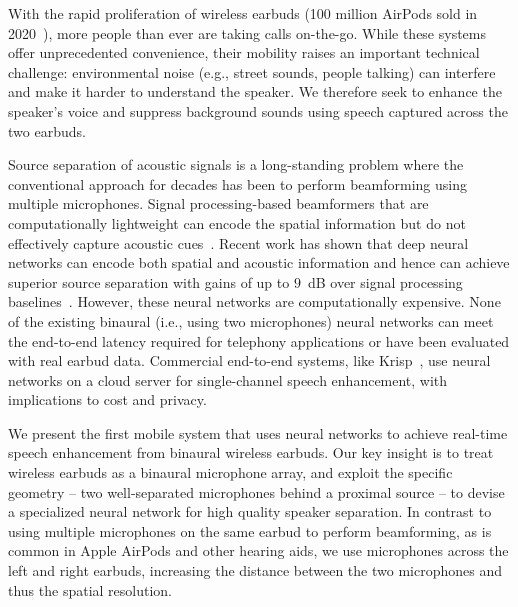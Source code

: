 \documentclass [11pt, proquest] {uwthesis}[2020/02/24]
\begin{document}


With the rapid proliferation of wireless earbuds (100 million AirPods sold in 2020~\cite{airpodssales}), more people than ever are taking calls on-the-go.  While these systems offer unprecedented convenience, their mobility raises an important technical challenge:  environmental noise (e.g., street sounds, people talking)  can interfere and make it harder to understand the speaker.
We therefore seek to enhance the speaker's voice and suppress background sounds using speech captured across the two earbuds. 


Source separation of acoustic signals  is a long-standing problem where the conventional approach for decades has been to perform beamforming using multiple microphones. Signal processing-based beamformers that are computationally lightweight can encode the spatial information  but do not effectively capture acoustic cues~\cite{van1988beamforming,krim1996two,chhetri2018multichannel}.  Recent work has shown that deep neural networks can encode both spatial and acoustic information and hence can  achieve superior source separation  with gains of up to $9$~dB over signal processing baselines~\cite{subakan2021attention,luo2019conv}. However, these neural networks are computationally expensive. None of the existing binaural (i.e., using two microphones) neural networks can  meet the end-to-end latency required for telephony applications or have been evaluated with real earbud data. Commercial end-to-end systems, like  Krisp~\cite{krisp}, use neural networks on a cloud server for single-channel  speech enhancement, with implications to  cost and privacy. %


We present the first mobile system that uses neural networks to achieve real-time speech enhancement from binaural wireless earbuds.
Our key insight is to treat wireless earbuds as a binaural microphone array,
and exploit the specific geometry -- two well-separated microphones behind a proximal source -- to devise a specialized neural network for high quality speaker separation. In contrast to using multiple microphones on the same earbud to perform beamforming, as is common in Apple AirPods \cite{airpods} and other hearing aids, we use microphones across the left and right earbuds, increasing the distance between the two microphones and thus the spatial resolution. 
\end{document}
